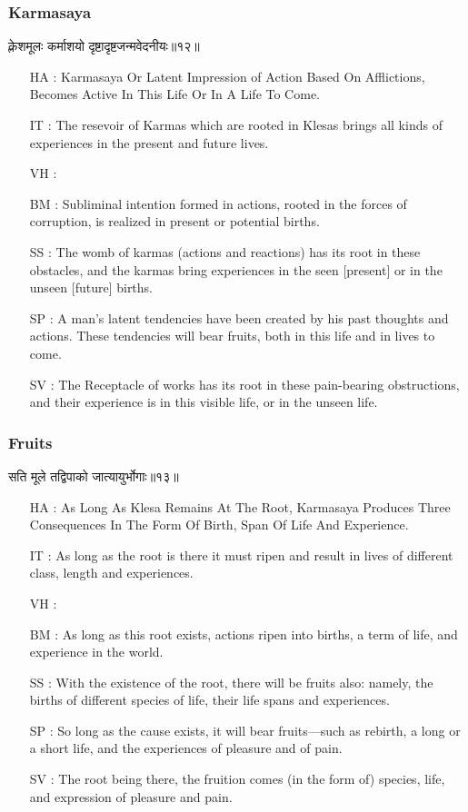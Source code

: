 \begin{frame}[fragile]\frametitle{Karmasaya}
\begin{sanskrit}
क्लेशमूलः कर्माशयो दृष्टादृष्टजन्मवेदनीयः॥१२॥
\end{sanskrit}

	\begin{itemize}
	\item [HA]: Karmasaya Or Latent Impression of Action Based On Afflictions, Becomes Active In This Life Or In A Life To Come.
	\item [IT]: The resevoir of Karmas which are rooted in Klesas brings all kinds of experiences in the present and future lives.
	\item [VH]: 
	\item [BM]: Subliminal intention formed in actions, rooted in the forces of corruption, is realized in present or potential births.
	\item [SS]: The womb of karmas (actions and reactions) has its root in these obstacles, and the karmas bring experiences in the seen [present] or in the unseen [future] births.
	\item [SP]: A man’s latent tendencies have been created by his past thoughts and actions. These tendencies will bear fruits, both in this life and in lives to come.
	\item [SV]: The Receptacle of works has its root in these pain-bearing obstructions, and their experience is in this visible life, or in the unseen life. 
	\end{itemize}
\end{frame}


\begin{frame}[fragile]\frametitle{Fruits}
\begin{sanskrit}
सति मूले तद्विपाको जात्यायुर्भोगाः॥१३॥
\end{sanskrit}

	\begin{itemize}
	\item [HA]: As Long As Klesa Remains At The Root, Karmasaya Produces Three Consequences In The Form Of Birth, Span Of Life And Experience.
	\item [IT]: As long as the root is there it must ripen and result in lives of different class, length and experiences.
	\item [VH]: 
	\item [BM]: As long as this root exists, actions ripen into births, a term of life, and experience in the world.
	\item [SS]: With the existence of the root, there will be fruits also: namely, the births of different species of life, their life spans and experiences.
	\item [SP]: So long as the cause exists, it will bear fruits—such as rebirth, a long or a short life, and the experiences of pleasure and of pain.
	\item [SV]: The root being there, the fruition comes (in the form of) species, life, and expression of pleasure and pain. 
	\end{itemize}
\end{frame}


